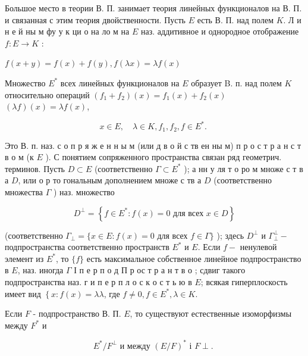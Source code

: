 \documentclass[10pt]{article}
\begin{document}
Большое место в теории В. П. занимает теория линейных функционалов на В. П. и связанная с этим теория двойственности. Пусть $E$ есть В. П. над полем $K$. Л и н е й ны м фу у к ци о на ло м на $E$ наз. аддитивное и однородное отображение $f: E \rightarrow K$ :



$f(x+y)=f(x)+f(y), f(\lambda x)=\lambda f(x)$



Множество $E^{*}$ всех линейных функционалов на $E$ образует B. п. над полем $K$ относительно операций $\left(f_{1}+f_{2}\right)(x)=f_{1}(x)+f_{2}(x)$ $(\lambda f)(x)=\lambda f(x)$,



\[

x \in E, \quad \lambda \in K, f_{1}, f_{2}, f \in E^{*} \text {. }

\]



Это В. п. наз. с о п р я ж е н н ы м (или д в о й с тв ен ны м) п р о с т р а н с т в о м (к $E$ ). С понятием сопряженного пространства связан ряд геометрич. терминов. Пусть $D \subset E$ (соответственно $\Gamma \subset E^{*}$ ); а нн у ля т о ро м множе с т в а $D$, или о р то гональным дополнением множе с тв а $D$ (соответственно множества $\Gamma$ ) наз. множество



\[

D^{\perp}=\left\{f \in E^{*}: f(x)=0 \text { для всех } x \in D\right\}

\]



(соответственно $\Gamma_{\perp}=\{x \in E: f(x)=0$ для всех $f \in \Gamma\}$ ); здесь $D^{\perp}$ и $\Gamma_{\perp}^{\perp}-$ подпространства соответственно пространств $E^{*}$ и $E$. Если $f-$ ненулевой элемент из $E^{*}$, то $\{f\}$ есть максимальное собственное линейное подпространство в $E$, наз. иногда $\Gamma$ І п е р п о д П р ос т р а н т в о ; сдвиг такого подпространства наз. г и п е р п л о с к о с т ь ю в $E$; всякая гиперплоскость имеет вид $\left\{x: f(x)=\lambda \lambda\right.$, где $f \neq 0, f \in E^{*}, \lambda \in K$.



Если $F$ - подпространство В. П. $E$, то существуют естественные изоморфизмы между $F^{*}$ и



\[

E^{*} / F^{\perp} \text { и между }(E / F)^{*} \text { і } F \perp \text {. }

\]
\end{document}
